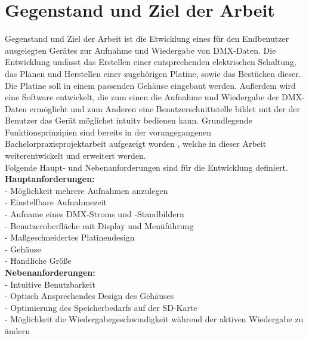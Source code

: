 
\newpage
\section{Gegenstand und Ziel der Arbeit}

Gegenstand und Ziel der Arbeit ist die Etwicklung eines für den Endbenutzer ausgelegten Gerätes zur Aufnahme und Wiedergabe von DMX-Daten. Die Entwicklung umfasst das Erstellen einer entsprechenden elektrischen Schaltung, das Planen und Herstellen einer zugehörigen Platine, sowie das Bestücken dieser. Die Platine soll in einem passenden Gehäuse eingebaut werden. Außerdem wird eine Software entwickelt, die zum einen die Aufnahme und Wiedergabe der DMX-Daten ermöglicht und zum Anderen eine Benutzerschnittstelle bildet mit der der Benutzer das Gerät möglichst intuitv bedienen kann. Grundlegende Funktionsprinzipien sind bereits in der vorangegangenen Bachelorpraxisprojektarbeit aufgezeigt worden \cite{Bauer2021}, welche in dieser Arbeit weiterentwickelt und erweitert werden. \\Folgende Haupt- und Nebenanforderungen sind für die Entwicklung definiert. \\

\hspace*{-5mm}\textbf{Hauptanforderungen:}\\
- Möglichkeit mehrere Aufnahmen anzulegen\\
- Einstellbare Aufnahmezeit\\
- Aufname eines DMX-Stroms und -Standbildern\\
- Benutzeroberfläche mit Display und Menüführung\\
- Maßgeschneidertes Platinendesign\\
- Gehäuse\\
- Handliche Größe\\

\hspace*{-5mm}\textbf{Nebenanforderungen:}\\
- Intuitive Benutzbarkeit\\
- Optisch Ansprechendes Design des Gehäuses\\
- Optimierung des Speicherbedarfs auf der SD-Karte\\
- Möglichkeit die Wiedergabegeschwindigkeit während der aktiven Wiedergabe zu ändern\\

